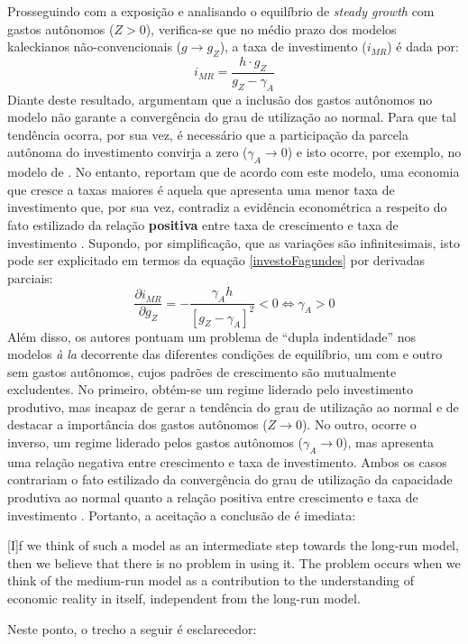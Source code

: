 Prosseguindo com a exposição e analisando o equilíbrio de \textit{steady growth} com gastos autônomos ($Z > 0$), verifica-se que no médio prazo dos modelos kaleckianos não-convencionais ($g\to g_Z$), a taxa de investimento ($i_{MR}$) é dada por:
\begin{equation}
\label{investoFagundes}
i_{MR} = \frac{h\cdot g_Z}{g_Z - \gamma_A}
\end{equation}
Diante deste resultado, \textcite{fagundes_role_2017} argumentam que a inclusão dos gastos autônomos no modelo não garante a convergência do grau de utilização ao normal. Para que tal tendência ocorra, por sua vez, é necessário que a participação da parcela autônoma do investimento convirja a zero ($\gamma_A \to 0$) e isto ocorre, por exemplo, no modelo de  \textcite{lavoie_convergence_2016}. 
No entanto, \textcite{fagundes_role_2017} reportam que de acordo com este modelo, uma economia que cresce a taxas maiores é aquela que apresenta uma menor taxa de investimento que, por sua vez, contradiz a evidência econométrica a respeito do fato estilizado da relação \textbf{positiva} entre taxa de crescimento e  taxa de investimento \cites{braga_investment_2018}{haluska_growth_2019}. Supondo, por simplificação, que as variações são infinitesimais, isto pode ser explicitado em termos da equação \ref{investoFagundes} por derivadas parciais:
$$
\frac{\partial i_{MR}}{\partial g_Z} = - \frac{\gamma_A h}{[g_Z - \gamma_A]^2} < 0 \Leftrightarrow \gamma_A > 0
$$
Além disso, os autores pontuam um problema de ``dupla indentidade'' nos modelos \textit{à la} \textcite{allain_tackling_2015} decorrente das diferentes condições de equilíbrio, um com e outro sem gastos autônomos, cujos padrões de crescimento são mutualmente excludentes. No primeiro, obtém-se um regime liderado pelo investimento produtivo, mas incapaz de gerar a tendência do grau de utilização ao normal e de destacar a importância dos gastos autônomos ($Z\to 0$). No outro, ocorre o inverso, um regime liderado pelos gastos autônomos ($\gamma_A \to 0$), mas apresenta uma relação negativa entre crescimento e taxa de investimento. Ambos os casos contrariam
o fato estilizado da convergência do grau de utilização da capacidade produtiva ao normal \cite{gahn_empirical_2019} quanto a relação positiva entre crescimento e taxa de investimento \cites{braga_investment_2018}{haluska_growth_2019}. Portanto, a aceitação a conclusão de \textcite[p.~13]{fagundes_role_2017} é imediata:

\begin{citacao}
	
	[I]f we think of such a model as an intermediate step towards the long-run model, then we
	believe that there is no problem in using it. The problem occurs when we think of the medium-run
	model as a contribution to the understanding of economic reality in itself, independent from the long-run model.
\end{citacao}
Neste ponto, o trecho a seguir é esclarecedor:

